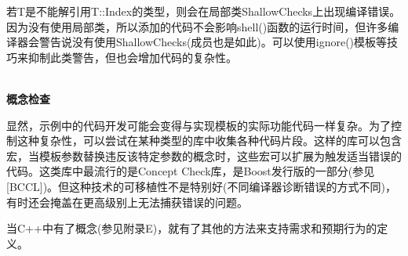 若T是不能解引用T::Index的类型，则会在局部类ShallowChecks上出现编译错误。因为没有使用局部类，所以添加的代码不会影响shell()函数的运行时间，但许多编译器会警告说没有使用ShallowChecks(成员也是如此)。可以使用ignore()模板等技巧来抑制此类警告，但也会增加代码的复杂性。

\hspace*{\fill} \\ %
\noindent
\textbf{概念检查}

显然，示例中的代码开发可能会变得与实现模板的实际功能代码一样复杂。为了控制这种复杂性，可以尝试在某种类型的库中收集各种代码片段。这样的库可以包含宏，当模板参数替换违反该特定参数的概念时，这些宏可以扩展为触发适当错误的代码。这类库中最流行的是Concept Check库，是Boost发行版的一部分(参见[BCCL])。但这种技术的可移植性不是特别好(不同编译器诊断错误的方式不同)，有时还会掩盖在更高级别上无法捕获错误的问题。

当C++中有了概念(参见附录E)，就有了其他的方法来支持需求和预期行为的定义。






























